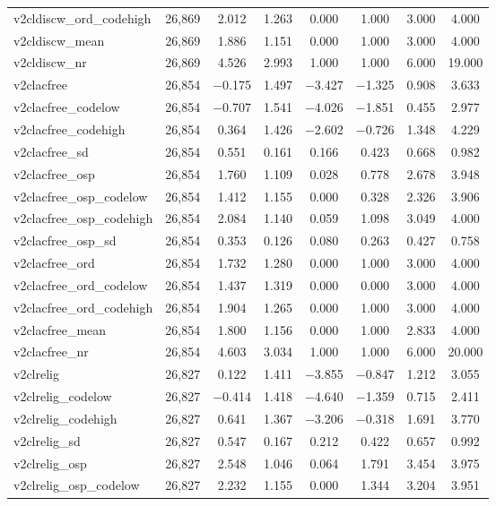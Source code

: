 \begin{table}[!htbp]
\begin{tabular}{@{\extracolsep{5pt}}lccccccc}
v2cldiscw\_ord\_codehigh & 26,869 & 2.012 & 1.263 & 0.000 & 1.000 & 3.000 & 4.000 \\ 
v2cldiscw\_mean & 26,869 & 1.886 & 1.151 & 0.000 & 1.000 & 3.000 & 4.000 \\ 
v2cldiscw\_nr & 26,869 & 4.526 & 2.993 & 1.000 & 1.000 & 6.000 & 19.000 \\ 
v2clacfree & 26,854 & $-$0.175 & 1.497 & $-$3.427 & $-$1.325 & 0.908 & 3.633 \\ 
v2clacfree\_codelow & 26,854 & $-$0.707 & 1.541 & $-$4.026 & $-$1.851 & 0.455 & 2.977 \\ 
v2clacfree\_codehigh & 26,854 & 0.364 & 1.426 & $-$2.602 & $-$0.726 & 1.348 & 4.229 \\ 
v2clacfree\_sd & 26,854 & 0.551 & 0.161 & 0.166 & 0.423 & 0.668 & 0.982 \\ 
v2clacfree\_osp & 26,854 & 1.760 & 1.109 & 0.028 & 0.778 & 2.678 & 3.948 \\ 
v2clacfree\_osp\_codelow & 26,854 & 1.412 & 1.155 & 0.000 & 0.328 & 2.326 & 3.906 \\ 
v2clacfree\_osp\_codehigh & 26,854 & 2.084 & 1.140 & 0.059 & 1.098 & 3.049 & 4.000 \\ 
v2clacfree\_osp\_sd & 26,854 & 0.353 & 0.126 & 0.080 & 0.263 & 0.427 & 0.758 \\ 
v2clacfree\_ord & 26,854 & 1.732 & 1.280 & 0.000 & 1.000 & 3.000 & 4.000 \\ 
v2clacfree\_ord\_codelow & 26,854 & 1.437 & 1.319 & 0.000 & 0.000 & 3.000 & 4.000 \\ 
v2clacfree\_ord\_codehigh & 26,854 & 1.904 & 1.265 & 0.000 & 1.000 & 3.000 & 4.000 \\ 
v2clacfree\_mean & 26,854 & 1.800 & 1.156 & 0.000 & 1.000 & 2.833 & 4.000 \\ 
v2clacfree\_nr & 26,854 & 4.603 & 3.034 & 1.000 & 1.000 & 6.000 & 20.000 \\ 
v2clrelig & 26,827 & 0.122 & 1.411 & $-$3.855 & $-$0.847 & 1.212 & 3.055 \\ 
v2clrelig\_codelow & 26,827 & $-$0.414 & 1.418 & $-$4.640 & $-$1.359 & 0.715 & 2.411 \\ 
v2clrelig\_codehigh & 26,827 & 0.641 & 1.367 & $-$3.206 & $-$0.318 & 1.691 & 3.770 \\ 
v2clrelig\_sd & 26,827 & 0.547 & 0.167 & 0.212 & 0.422 & 0.657 & 0.992 \\ 
v2clrelig\_osp & 26,827 & 2.548 & 1.046 & 0.064 & 1.791 & 3.454 & 3.975 \\ 
v2clrelig\_osp\_codelow & 26,827 & 2.232 & 1.155 & 0.000 & 1.344 & 3.204 & 3.951 \\ 

\end{tabular}
\end{table}
